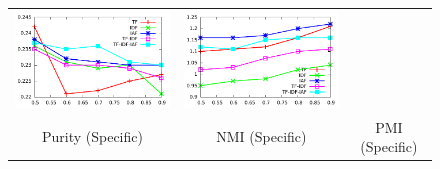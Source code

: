 \documentclass[10pt,a5paper,twoside]{article}
\begin{document}
\begin{figure}[t!]
\begin{center}
{\begin{tabular}{ccc}
		\includegraphics[width=200pt]{Figs/2-2.pdf} & 
		 \includegraphics[width=200pt]{Figs/2-3.pdf} \\
\vspace{-1mm}
		{ Purity (Specific)} & { NMI (Specific)} & 
		{ PMI (Specific)}\\


\end{tabular}}
\end{center}
\end{figure}
\end{document}
